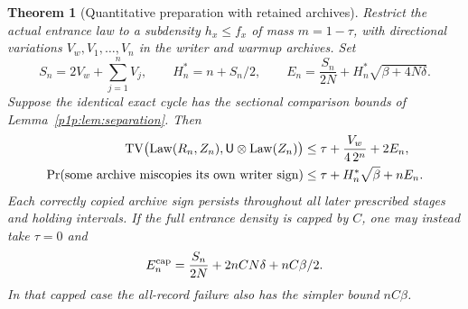 \documentclass[11pt]{article}
\numberwithin{equation}{section}
\newtheorem{theorem}{Theorem}[section]
\theoremstyle{definition}
\theoremstyle{remark}
\begin{document}
\begin{theorem}[Quantitative preparation with retained archives]
\label{p1p:thm:prep}
Restrict the actual entrance law to a subdensity $h_x\leq f_x$ of mass
$m=1-\tau$, with directional variations $V_w,V_1,\ldots,V_n$ in the writer
and warmup archives. Set
\begin{equation}\label{p1p:eq:Vsum}
 S_n=2V_w+\sum_{j=1}^n V_j,\qquad H_n^*=n+S_n/2,
 \qquad E_n=\frac{S_n}{2N}+H_n^*\sqrt{\beta+4N\delta}.
\end{equation}
Suppose the identical exact cycle has the sectional comparison bounds
of Lemma~\ref{p1p:lem:separation}. Then
\begin{align}
 \operatorname{TV}\bigl(\operatorname{Law}(R_n,Z_n),\mathsf U\otimes\operatorname{Law}(Z_n)\bigr)
 &\leq\tau+\frac{V_w}{4\,2^n}+2E_n,
 \label{p1p:eq:freshness}\\
 \Pr(\hbox{some archive miscopies its own writer sign})
 &\leq\tau+H_n^*\sqrt\beta+nE_n.
 \label{p1p:eq:allrecords}
\end{align}
Each correctly copied archive sign persists throughout all later
prescribed stages and holding intervals. If the full entrance density
is capped by $C$, one may instead take $\tau=0$ and
\begin{equation}\label{p1p:eq:cappedE}
 E_n^{\rm cap}=\frac{S_n}{2N}+2nCN\delta+nC\beta/2.
\end{equation}
In that capped case the all-record failure also has the simpler bound
$nC\beta$.
\end{theorem}
\end{document}
